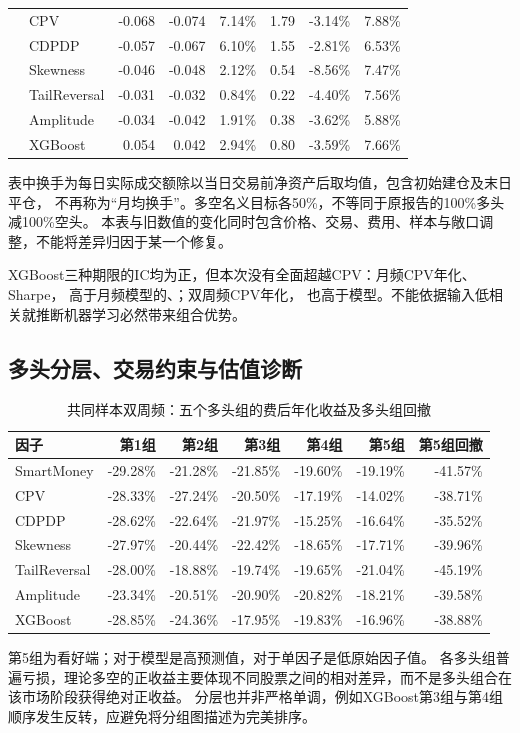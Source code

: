 \documentclass[UTF8,zihao=-4,fontset=fandol]{ctexart}
\begin{document}
\begin{table}[H]
\begin{tabular}{llrrrrrr}
 & CPV & -0.068 & -0.074 & 7.14\% & 1.79 & -3.14\% & 7.88\% \\
 & CDPDP & -0.057 & -0.067 & 6.10\% & 1.55 & -2.81\% & 6.53\% \\
 & Skewness & -0.046 & -0.048 & 2.12\% & 0.54 & -8.56\% & 7.47\% \\
 & TailReversal & -0.031 & -0.032 & 0.84\% & 0.22 & -4.40\% & 7.56\% \\
 & Amplitude & -0.034 & -0.042 & 1.91\% & 0.38 & -3.62\% & 5.88\% \\
\rowcolor{blue!8}
 & XGBoost & 0.054 & 0.042 & 2.94\% & 0.80 & -3.59\% & 7.66\% \\
\midrule
\bottomrule
\end{tabular}\end{table}

表中换手为每日实际成交额除以当日交易前净资产后取均值，包含初始建仓及末日平仓，
不再称为“月均换手”。多空名义目标各50\%，不等同于原报告的100\%多头减100\%空头。
本表与旧数值的变化同时包含价格、交易、费用、样本与敞口调整，不能将差异归因于某一个修复。

XGBoost三种期限的IC均为正，但本次没有全面超越CPV：月频CPV年化\CPVMonthReturn、Sharpe\CPVMonthSharpe，
高于月频模型的\ModelMonthReturn、\ModelMonthSharpe；双周频CPV年化\CPVBiweekReturn，
也高于模型\ModelBiweekReturn。不能依据输入低相关就推断机器学习必然带来组合优势。

\clearpage
\subsection{多头分层、交易约束与估值诊断}
\begin{table}[H]\centering\small
\caption{共同样本双周频：五个多头组的费后年化收益及多头组回撤}
\begin{tabular}{lrrrrrr}\toprule
因子 & 第1组 & 第2组 & 第3组 & 第4组 & 第5组 & 第5组回撤\\\midrule
SmartMoney & -29.28\% & -21.28\% & -21.85\% & -19.60\% & -19.19\% & -41.57\% \\
CPV & -28.33\% & -27.24\% & -20.50\% & -17.19\% & -14.02\% & -38.71\% \\
CDPDP & -28.62\% & -22.64\% & -21.97\% & -15.25\% & -16.64\% & -35.52\% \\
Skewness & -27.97\% & -20.44\% & -22.42\% & -18.65\% & -17.71\% & -39.96\% \\
TailReversal & -28.00\% & -18.88\% & -19.74\% & -19.65\% & -21.04\% & -45.19\% \\
Amplitude & -23.34\% & -20.51\% & -20.90\% & -20.82\% & -18.21\% & -39.58\% \\
XGBoost & -28.85\% & -24.36\% & -17.95\% & -19.83\% & -16.96\% & -38.88\% \\
\bottomrule
\end{tabular}\end{table}
第5组为看好端；对于模型是高预测值，对于单因子是低原始因子值。
各多头组普遍亏损，理论多空的正收益主要体现不同股票之间的相对差异，而不是多头组合在该市场阶段获得绝对正收益。
分层也并非严格单调，例如XGBoost第3组与第4组顺序发生反转，应避免将分组图描述为完美排序。
\end{document}
